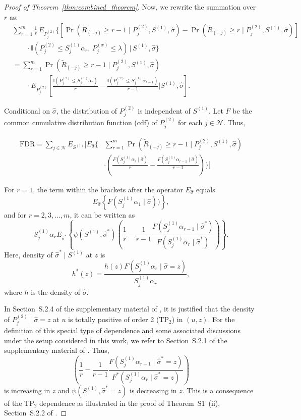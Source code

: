 \documentclass[11pt]{article}
\numberwithin{equation}{section}
\theoremstyle{plain}
\theoremstyle{remark}
\begin{document}
\begin{proof}[Proof of Theorem~\ref{thm:combined_theorem}]
Now, we rewrite the summation over $r$ as:
\begin{align*}
& \sum_{r=1}^{m} \frac{1}{r} \, E_{P_j^{(2)}} \Bigg\{ 
\left[ 
\Pr\left(\tilde{R}_{(-j)} \geq r - 1 \mid P^{(2)}_j, S^{(1)}, \hat{\sigma} \right)
- 
\Pr\left(\tilde{R}_{(-j)} \geq r \mid P^{(2)}_j, S^{(1)}, \hat{\sigma} \right)
\right] \\
& \qquad \cdot \mathbb{I}\left(P^{(2)}_j \leq S^{(1)}_j\alpha_r,\, P^{(x)}_j \leq \lambda\right)
\, \Bigg| \, S^{(1)}, \hat{\sigma} \Bigg\}\\
& = \sum_{r=1}^{m} \Pr(\tilde{R}_{(-j)} \geq r - 1 \mid P^{(2)}_j, S^{(1)}, \hat{\sigma})\\
& \qquad \cdot E_{P_j^{(2)}}\left[ \frac{\mathbb{I}(P^{(2)}_j \leq S^{(1)}_j\alpha_r)}{r} - \frac{\mathbb{I}(P^{(2)}_j \leq S^{(1)}_j\alpha_{r-1})}{r - 1} \Bigg| S^{(1)},\hat{\sigma}\right].
\end{align*}

Conditional on $\hat{\sigma}$, the distribution of $P_j^{(2)}$ is independent of $S^{(1)}$. Let $F$ be the common cumulative distribution function (cdf) of $P_j^{(2)}$ for each $j\in \mathcal{N}$. Thus, 

\begin{align*}
\mathrm{FDR} = \sum_{j \in \mathcal{N}} E_{S^{(1)}} \Bigg[ E_{\hat{\sigma}} \Bigg\{ 
& \sum_{r=1}^{m} \Pr\left(\tilde{R}_{(-j)} \geq r - 1 \mid P^{(2)}_j, S^{(1)}, \hat{\sigma}\right) \\
& \cdot \left( \frac{F(S^{(1)}_j\alpha_r\mid \hat{\sigma})}{r} - \frac{F(S^{(1)}_j\alpha_{r-1}\mid \hat{\sigma})}{r - 1} \right)
\Bigg\} \Bigg]
\end{align*}

For $r=1$, the term within the brackets after the operator $E_{\hat{\sigma}}$ equals
\[
E_{\hat{\sigma}}\left\{F(S_j^{(1)}\alpha_1\mid \hat{\sigma}))\right\},
\]
and for $r=2,3,...,m$, it can be written as 
\[
S^{(1)}_j\alpha_r E_{\hat{\sigma}^*}\left\{\psi(S^{(1)},\hat{\sigma}^*)\left(\frac{1}{r}-\frac{1}{r-1}\frac{F(S^{(1)}_j\alpha_{r-1}\mid \hat{\sigma}^*)}{F(S^{(1)}_j\alpha_r\mid \hat{\sigma}^*)}\right)\right\}.
\]
Here, density of $\hat{\sigma}^*\mid S^{(1)}$ at $z$ is
\[
h^*(z)=\frac{h(z)F(S^{(1)}_j\alpha_r\mid \hat{\sigma}=z)}{S^{(1)}_j\alpha_r},
\]
where $h$ is the density of $\hat{\sigma}$. 

In Section~S.2.4 of the supplementary material of \citet{sarkar2022adjusting}, it is justified that the density of $P_j^{(2)}\mid \hat{\sigma}=z$ at $u$ is totally positive of order 2 (TP$_2$) in $(u,z)$. For the definition of this special type of dependence and some associated discussions under the setup considered in this work, we refer to Section~S.2.1 of the supplementary material of \citet{sarkar2022adjusting}. Thus, 
\[
\left(\frac{1}{r}-\frac{1}{r-1}\frac{F(S^{(1)}_j\alpha_{r-1}\mid \hat{\sigma}^*=z)}{F^*(S^{(1)}_j\alpha_r\mid \hat{\sigma}^*=z)}\right)
\]
is increasing in $z$ and $\psi(S^{(1)},\hat{\sigma}^*=z)$ is decreasing in $z$. This is a consequence of the TP$_2$ dependence as illustrated in the proof of Theorem~S1~(ii), Section~S.2.2 of \citet{sarkar2022adjusting}. 


\end{proof}
\end{document}
